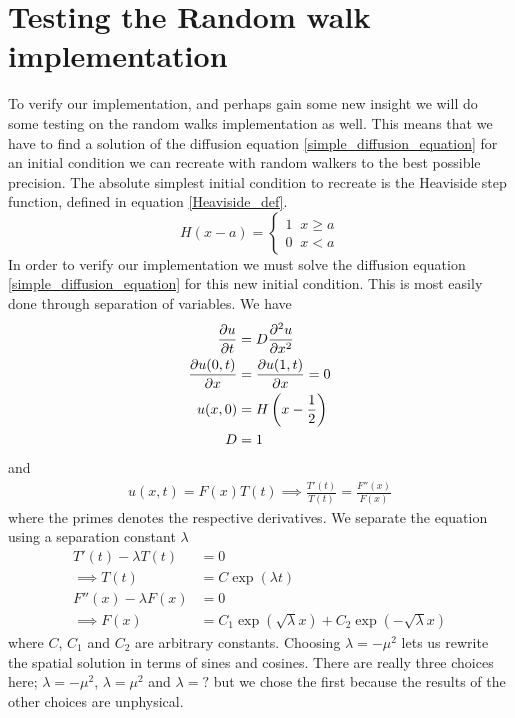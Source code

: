 \section{Testing the Random walk implementation}\label{testing_random_walks}



To verify our implementation, and perhaps gain some new insight we will do some testing on the random walks implementation as well. 
This means that we have to find a solution of the diffusion equation \eqref{simple_diffusion_equation} for an initial condition we can recreate with random walkers to the best possible precision. 
The absolute simplest initial condition to recreate is the Heaviside step function, defined in equation \eqref{Heaviside_def}. 
\begin{equation}\label{Heaviside_def}
 H(x-a) = \begin{cases}
           1\;\;x\geq a\\
           0\;\;x<a
          \end{cases}
\end{equation}
In order to verify our implementation we must solve the diffusion equation \eqref{simple_diffusion_equation} for this new initial condition. 
This is most easily done through separation of variables. We have
\begin{align}
 \frac{\partial u}{\partial t} &= D\frac{\partial^2 u}{\partial x^2}\\
 \frac{\partial u(0,t)}{\partial x} &= \frac{\partial u(1,t)}{\partial x} = 0 \\
 u(x,0) &= H\left(x-\frac{1}{2}\right)\\
 D &= 1
\end{align}
and
\begin{align*}
 u(x,t) = F(x)T(t) \implies \frac{T'(t)}{T(t)} = \frac{F''(x)}{F(x)}
\end{align*}
where the primes denotes the respective derivatives. We separate the equation using a separation constant $\lambda$
\begin{align*}
 T'(t)-\lambda T(t) &= 0 \\
 \implies T(t) &= C\exp(\lambda t)\\
 F''(x) -\lambda F(x) &= 0 \\
 \implies F(x) &= C_1\exp(\sqrt{\lambda}x) + C_2\exp(-\sqrt{\lambda}x)
\end{align*}
where $C$, $C_1$ and $C_2$ are arbitrary constants. 
Choosing $\lambda = -\mu^2$ lets us rewrite the spatial solution in terms of sines and cosines. 
There are really three choices here; $\lambda = -\mu^2$, $\lambda = \mu^2$ and $\lambda = ?$ but we chose the first because the results of the other choices are unphysical.
